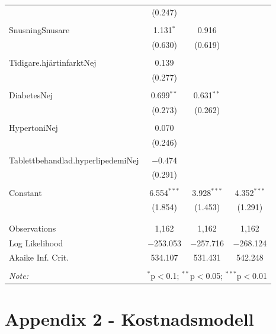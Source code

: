 {\begin{table}[!htbp]
\begin{tabular}{@{\extracolsep{5pt}}lccc}
  & (0.247) &  &  \\ 
  & & & \\ 
 SnusningSnusare & 1.131$^{*}$ & 0.916 &  \\ 
  & (0.630) & (0.619) &  \\ 
  & & & \\ 
 Tidigare.hjärtinfarktNej & 0.139 &  &  \\ 
  & (0.277) &  &  \\ 
  & & & \\ 
 DiabetesNej & 0.699$^{**}$ & 0.631$^{**}$ &  \\ 
  & (0.273) & (0.262) &  \\ 
  & & & \\ 
 HypertoniNej & 0.070 &  &  \\ 
  & (0.246) &  &  \\ 
  & & & \\ 
 Tablettbehandlad.hyperlipedemiNej & $-$0.474 &  &  \\ 
  & (0.291) &  &  \\ 
  & & & \\ 
 Constant & 6.554$^{***}$ & 3.928$^{***}$ & 4.352$^{***}$ \\ 
  & (1.854) & (1.453) & (1.291) \\ 
  & & & \\ 
\hline \\[-1.8ex] 
Observations & 1,162 & 1,162 & 1,162 \\ 
Log Likelihood & $-$253.053 & $-$257.716 & $-$268.124 \\ 
Akaike Inf. Crit. & 534.107 & 531.431 & 542.248 \\ 
\hline 
\hline \\[-1.8ex] 
\textit{Note:}  & \multicolumn{3}{r}{$^{*}$p$<$0.1; $^{**}$p$<$0.05; $^{***}$p$<$0.01} \\ 
\end{tabular} 
\end{table} 
}

\newpage

\section{Appendix 2 - Kostnadsmodell}

